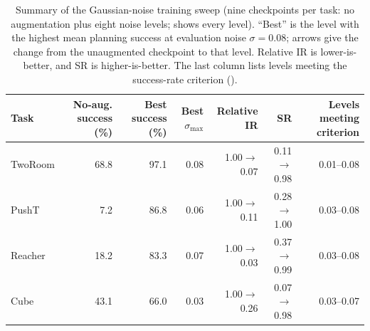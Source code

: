 \begin{table}[H]
\centering
\caption{Summary of the Gaussian-noise training sweep (nine checkpoints per task: no augmentation plus eight noise levels;  shows every level). ``Best'' is the level with the highest mean planning success at evaluation noise $\sigma=0.08$; arrows give the change from the unaugmented checkpoint to that level. Relative IR is lower-is-better, and SR is higher-is-better. The last column lists levels meeting the success-rate criterion ().}
\label{tab:full-sweep-compact}
\footnotesize
\setlength{\tabcolsep}{3.5pt}
\begin{tabular}{lrrrrrr}
\toprule
Task & No-aug. success (\%) & Best success (\%) & Best $\sigma_{\max}$ & Relative IR & SR & Levels meeting criterion \\
\midrule
TwoRoom & 68.8 & 97.1 & 0.08 & 1.00$\to$0.07 & 0.11$\to$0.98 & 0.01--0.08 \\
PushT & 7.2 & 86.8 & 0.06 & 1.00$\to$0.11 & 0.28$\to$1.00 & 0.03--0.08 \\
Reacher & 18.2 & 83.3 & 0.07 & 1.00$\to$0.03 & 0.37$\to$0.99 & 0.03--0.08 \\
Cube & 43.1 & 66.0 & 0.03 & 1.00$\to$0.26 & 0.07$\to$0.98 & 0.03--0.07 \\
\bottomrule
\end{tabular}
\end{table}
